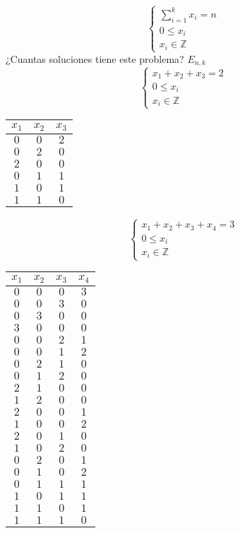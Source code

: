 \documentclass[../main.tex]{subfiles}
\begin{document}
\[
	\begin{cases}
		\sum^k_{i=1}x_i=n\\
		0 \leq x_i\\
		x_i\in \mathbb{Z}
	\end{cases}
\]
¿Cuantas soluciones tiene este problema? $E_{n,k}$
\[
	\begin{cases}
		x_1+x_2+x_3=2\\
		0 \leq x_i\\
		x_i\in \mathbb{Z}
	\end{cases}
\]
\begin{center}
	\begin{tabular}{c|c|c}
		$x_1$ & $x_2$ & $x_3$\\
		\hline
		$0$ & $0$ & $2$\\
		$0$ & $2$ & $0$\\
		$2$ & $0$ & $0$\\
		\hline
		$0$ & $1$ & $1$\\
		$1$ & $0$ & $1$\\
		$1$ & $1$ & $0$\\
		\hline
	\end{tabular}
\end{center}
\[
	\begin{cases}
		x_1+x_2+x_3+x_4=3\\
		0 \leq x_i\\
		x_i\in \mathbb{Z}
	\end{cases}
\]
\begin{center}
	\begin{tabular}{c|c|c|c}
		$x_1$ & $x_2$ & $x_3$ & $x_4$\\
		\hline
		$0$ & $0$ & $0$ & $3$\\
		$0$ & $0$ & $3$ & $0$\\
		$0$ & $3$ & $0$ & $0$\\
		$3$ & $0$ & $0$ & $0$\\
		\hline
		$0$ & $0$ & $2$ & $1$\\
		$0$ & $0$ & $1$ & $2$\\
		$0$ & $2$ & $1$ & $0$\\
		$0$ & $1$ & $2$ & $0$\\
		$2$ & $1$ & $0$ & $0$\\
		$1$ & $2$ & $0$ & $0$\\
		$2$ & $0$ & $0$ & $1$\\
		$1$ & $0$ & $0$ & $2$\\
		$2$ & $0$ & $1$ & $0$\\
		$1$ & $0$ & $2$ & $0$\\
		$0$ & $2$ & $0$ & $1$\\
		$0$ & $1$ & $0$ & $2$\\
		\hline
		$0$ & $1$ & $1$ & $1$\\
		$1$ & $0$ & $1$ & $1$\\
		$1$ & $1$ & $0$ & $1$\\
		$1$ & $1$ & $1$ & $0$\\
	\end{tabular}
\end{center}
\end{document}
